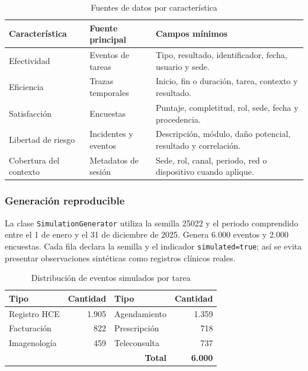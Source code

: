 \begin{table}[H]
\centering
\caption{Fuentes de datos por característica}
\label{tab:data-sources}
\begin{tabularx}{\textwidth}{p{3.0cm}p{3.6cm}Y}
\toprule
Característica & Fuente principal & Campos mínimos \\
\midrule
Efectividad & Eventos de tareas & Tipo, resultado, identificador, fecha, usuario y sede. \\
Eficiencia & Trazas temporales & Inicio, fin o duración, tarea, contexto y resultado. \\
Satisfacción & Encuestas & Puntaje, completitud, rol, sede, fecha y procedencia. \\
Libertad de riesgo & Incidentes y eventos & Descripción, módulo, daño potencial, resultado y correlación. \\
Cobertura del contexto & Metadatos de sesión & Sede, rol, canal, periodo, red o dispositivo cuando aplique. \\
\bottomrule
\end{tabularx}
\end{table}

\subsubsection{Generación reproducible}

La clase \texttt{SimulationGenerator} utiliza la semilla 25022 y el periodo comprendido entre el 1 de enero y el 31 de diciembre de 2025. Genera 6.000 eventos y 2.000 encuestas. Cada fila declara la semilla y el indicador \texttt{simulated=true}; así se evita presentar observaciones sintéticas como registros clínicos reales.

\begin{table}[H]
\centering
\caption{Distribución de eventos simulados por tarea}
\label{tab:event-types}
\begin{tabular}{lr@{\hspace{1.2cm}}lr}
\toprule
Tipo & Cantidad & Tipo & Cantidad \\
\midrule
Registro HCE & 1.905 & Agendamiento & 1.359 \\
Facturación & 822 & Prescripción & 718 \\
Imagenología & 459 & Teleconsulta & 737 \\
\midrule
\multicolumn{3}{r}{\textbf{Total}} & \textbf{6.000} \\
\bottomrule
\end{tabular}
\end{table}

